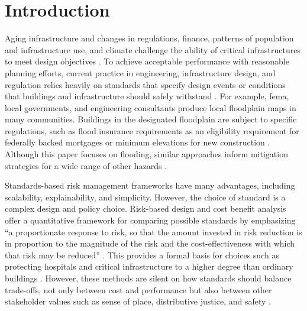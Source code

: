 \documentclass{agujournal2019}
\begin{document}
\clearpage
\section{Introduction}\label{sec:introduction}

Aging infrastructure and changes in regulations, finance, patterns of population and infrastructure use, and climate challenge the ability of critical infrastructures to meet design objectives \cite{doss-gollin_txtreme:2021,doss-gollin_fatalism:2020,chester_reliable:2020,asce_infrastructure_climate:2021,ho_dams:2017}.
To achieve acceptable performance with reasonable planning efforts, current practice in engineering, infrastructure design, and regulation relies heavily on standards that specify design events or conditions that buildings and infrastructure should safely withstand \cite{bruneau_multihazard:2017}.
For example, \gls{fema}, local governments, and engineering consultants produce local floodplain maps in many communities.
Buildings in the designated floodplain are subject to specific regulations, such as flood insurance requirements as an eligibility requirement for federally backed mortgages \cite{kousky_voucher:2014} or minimum elevations for new construction \cite{asce_24-05:2006,FEMA_p-55:2011}.
Although this paper focuses on flooding, similar approaches inform mitigation strategies for a wide range of other hazards \cite{asce_7-10:2013}.

Standards-based risk management frameworks have many advantages, including scalability, explainability, and simplicity.
However, the choice of standard is a complex design and policy choice.
Risk-based design and cost benefit analysis \cite{eijgenraam_flooding:2014,vandantzig_dike:1956,xian_elevation:2017} offer a quantitative framework for comparing possible standards by emphasizing ``a proportionate response to risk, so that the amount invested in risk reduction is in proportion to the magnitude of the risk and the cost-effectiveness with which that risk may be reduced'' \cite{merz_fluvial:2010}.
This provides a formal basis for choices such as protecting hospitals and critical infrastructure to a higher degree than ordinary buildings \cite{asce_7-10:2013}.
However, these methods are silent on how standards should balance trade-offs, not only between cost and performance but also between other stakeholder values such as sense of place, distributive justice, and safety \cite{keller_management:2021,helgeson_manifesto:2022,quinn_rivalframings:2017,bessette_vimm:2017,vezer_epistemic:2018}.
\end{document}
